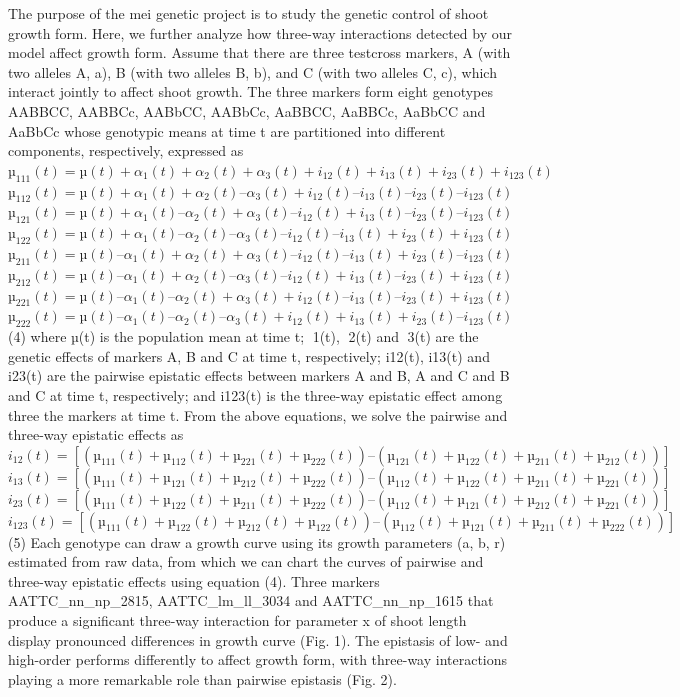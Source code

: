 \documentclass[]{book}
\theoremstyle{definition}
\theoremstyle{definition}
\theoremstyle{remark}
\begin{document}
The purpose of the mei genetic project is to study the genetic control
of shoot growth form. Here, we further analyze how three-way
interactions detected by our model affect growth form. Assume that there
are three testcross markers, A (with two alleles A, a), B (with two
alleles B, b), and C (with two alleles C, c), which interact jointly to
affect shoot growth. The three markers form eight genotypes AABBCC,
AABBCc, AABbCC, AABbCc, AaBBCC, AaBBCc, AaBbCC and AaBbCc whose
genotypic means at time t are partitioned into different components,
respectively, expressed as
\(µ_111(t) = µ(t) + \alpha_1(t) + \alpha_2(t) + \alpha_3(t) + i_12(t) + i_13(t) + i_23(t) + i_123(t)\)
\(µ_112(t) = µ(t) + \alpha_1(t) + \alpha_2(t) – \alpha_3(t) + i_12(t) – i_13(t) – i_23(t) – i_123(t)\)
\(µ_121(t) = µ(t) + \alpha_1(t) – \alpha_2(t) + \alpha_3(t) – i_12(t) + i_13(t) – i_23(t) – i_123(t)\)
\(µ_122(t) = µ(t) + \alpha_1(t) – \alpha_2(t) – \alpha_3(t) – i_12(t) – i_13(t) + i_23(t) + i_123(t)\)
\(µ_211(t) = µ(t) – \alpha_1(t) + \alpha_2(t) + \alpha_3(t) – i_12(t) – i_13(t) + i_23(t) – i_123(t)\)
\(µ_212(t) = µ(t) – \alpha_1(t) + \alpha_2(t) – \alpha_3(t) – i_12(t) + i_13(t) – i_23(t) + i_123(t)\)
\(µ_221(t) = µ(t) – \alpha_1(t) – \alpha_2(t) + \alpha_3(t) + i_12(t) – i_13(t) – i_23(t) + i_123(t)\)
\(µ_222(t) = µ(t) – \alpha_1(t) – \alpha_2(t) – \alpha_3(t) + i_12(t) + i_13(t) + i_23(t) – i_123(t)\)
(4) where µ(t) is the population mean at time t; 1(t), 2(t) and 3(t)
are the genetic effects of markers A, B and C at time t, respectively;
i12(t), i13(t) and i23(t) are the pairwise epistatic effects between
markers A and B, A and C and B and C at time t, respectively; and
i123(t) is the three-way epistatic effect among three the markers at
time t. From the above equations, we solve the pairwise and three-way
epistatic effects as
\(i_12(t) = [(µ_111(t) + µ_112(t) + µ_221(t) + µ_222(t)) – (µ_121(t) + µ_122(t) + µ_211(t) + µ_212(t))]\)
\(i_13(t) = [(µ_111(t) + µ_121(t) + µ_212(t) + µ_222(t)) – (µ_112(t) + µ_122(t) + µ_211(t) + µ_221(t))]\)
\(i_23(t) = [(µ_111(t) + µ_122(t) + µ_211(t) + µ_222(t)) – (µ_112(t) + µ_121(t) + µ_212(t) + µ_221(t))]\)
\(i_123(t) = [(µ_111(t) + µ_122(t) + µ_212(t) + µ_122(t)) – (µ_112(t) + µ_121(t) + µ_211(t) + µ_222(t))]\)
(5) Each genotype can draw a growth curve using its growth parameters
(a, b, r) estimated from raw data, from which we can chart the curves of
pairwise and three-way epistatic effects using equation (4). Three
markers AATTC\_nn\_np\_2815, AATTC\_lm\_ll\_3034 and AATTC\_nn\_np\_1615
that produce a significant three-way interaction for parameter x of
shoot length display pronounced differences in growth curve (Fig. 1).
The epistasis of low- and high-order performs differently to affect
growth form, with three-way interactions playing a more remarkable role
than pairwise epistasis (Fig. 2).
\end{document}
